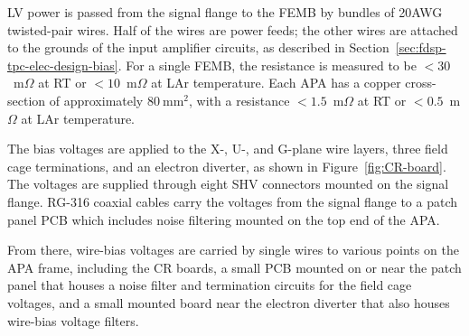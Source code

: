 LV power is passed from the signal flange to the FEMB by bundles of
20AWG twisted-pair wires. Half of the wires are power feeds; the other wires
are attached to the grounds of the input amplifier circuits, as described in Section~\ref{sec:fdsp-tpc-elec-design-bias}.
For a single FEMB, the resistance is measured to be $<30$~m$\Omega$ at RT or $<10$~m$\Omega$ at 
LAr temperature. Each APA has a copper cross-section of approximately $80~\mathrm{mm}^2$, with a 
resistance $<1.5$~m$\Omega$ at RT or $<0.5$~m$\Omega$ at LAr temperature.

The bias voltages are applied to the X-, U-, and G-plane wire layers, three field cage terminations, 
and an electron diverter, as shown in Figure~\ref{fig:CR-board}. The voltages are supplied 
through eight SHV connectors mounted on the signal flange. RG-316 coaxial cables carry the voltages 
from the signal flange to a patch panel PCB which includes noise filtering mounted on the top 
end of the APA. 

From there, wire-bias voltages are carried by single wires to 
various points on the APA frame, including the CR boards, a small PCB mounted on or near 
the patch panel that houses a noise filter and termination circuits for the field cage voltages, and 
a small mounted board near the electron diverter that also houses wire-bias voltage filters.
